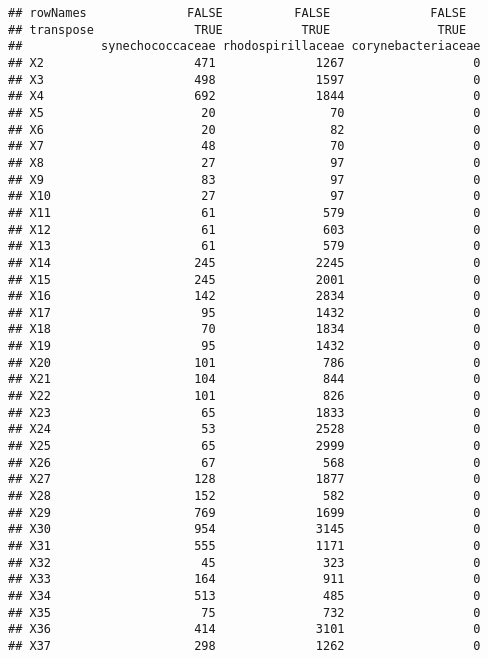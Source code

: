 \documentclass[12pt]{beamer}\usepackage[]{graphicx}\usepackage[]{color}
\makeatletter
\newenvironment{kframe}{%
 \def\at@end@of@kframe{}%
 \ifinner\ifhmode%
  \def\at@end@of@kframe{\end{minipage}}%
  \begin{minipage}{\columnwidth}%
 \fi\fi%
 \def\FrameCommand##1{\hskip\@totalleftmargin \hskip-\fboxsep
 \colorbox{shadecolor}{##1}\hskip-\fboxsep
     \hskip-\linewidth \hskip-\@totalleftmargin \hskip\columnwidth}%
 \MakeFramed {\advance\hsize-\width
   \@totalleftmargin\z@ \linewidth\hsize
   \@setminipage}}%
 {\par\unskip\endMakeFramed%
 \at@end@of@kframe}
\newenvironment{knitrout}{}{} %
\makeatother
\begin{document}
\begin{frame}[fragile]
\begin{knitrout}
\begin{kframe}
\begin{verbatim}
## rowNames              FALSE          FALSE              FALSE
## transpose              TRUE           TRUE               TRUE
##           synechococcaceae rhodospirillaceae corynebacteriaceae
## X2                     471              1267                  0
## X3                     498              1597                  0
## X4                     692              1844                  0
## X5                      20                70                  0
## X6                      20                82                  0
## X7                      48                70                  0
## X8                      27                97                  0
## X9                      83                97                  0
## X10                     27                97                  0
## X11                     61               579                  0
## X12                     61               603                  0
## X13                     61               579                  0
## X14                    245              2245                  0
## X15                    245              2001                  0
## X16                    142              2834                  0
## X17                     95              1432                  0
## X18                     70              1834                  0
## X19                     95              1432                  0
## X20                    101               786                  0
## X21                    104               844                  0
## X22                    101               826                  0
## X23                     65              1833                  0
## X24                     53              2528                  0
## X25                     65              2999                  0
## X26                     67               568                  0
## X27                    128              1877                  0
## X28                    152               582                  0
## X29                    769              1699                  0
## X30                    954              3145                  0
## X31                    555              1171                  0
## X32                     45               323                  0
## X33                    164               911                  0
## X34                    513               485                  0
## X35                     75               732                  0
## X36                    414              3101                  0
## X37                    298              1262                  0

\end{verbatim}
\end{kframe}
\end{knitrout}
\end{frame}
\end{document}
